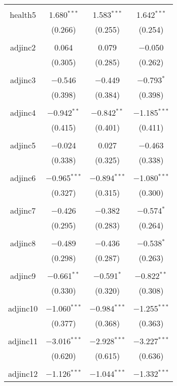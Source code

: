 \documentclass{article}
\begin{document}
\begin{longtable}{cccc}
  & & & \\ 
 health5 & 1.680$^{***}$ & 1.583$^{***}$ & 1.642$^{***}$ \\ 
  & (0.266) & (0.255) & (0.254) \\ 
  & & & \\ 
 adjinc2 & 0.064 & 0.079 & $-$0.050 \\ 
  & (0.305) & (0.285) & (0.262) \\ 
  & & & \\ 
 adjinc3 & $-$0.546 & $-$0.449 & $-$0.793$^{*}$ \\ 
  & (0.398) & (0.384) & (0.398) \\ 
  & & & \\ 
 adjinc4 & $-$0.942$^{**}$ & $-$0.842$^{**}$ & $-$1.185$^{***}$ \\ 
  & (0.415) & (0.401) & (0.411) \\ 
  & & & \\ 
 adjinc5 & $-$0.024 & 0.027 & $-$0.463 \\ 
  & (0.338) & (0.325) & (0.338) \\ 
  & & & \\ 
 adjinc6 & $-$0.965$^{***}$ & $-$0.894$^{***}$ & $-$1.080$^{***}$ \\ 
  & (0.327) & (0.315) & (0.300) \\ 
  & & & \\ 
 adjinc7 & $-$0.426 & $-$0.382 & $-$0.574$^{*}$ \\ 
  & (0.295) & (0.283) & (0.264) \\ 
  & & & \\ 
 adjinc8 & $-$0.489 & $-$0.436 & $-$0.538$^{*}$ \\ 
  & (0.298) & (0.287) & (0.263) \\ 
  & & & \\ 
 adjinc9 & $-$0.661$^{**}$ & $-$0.591$^{*}$ & $-$0.822$^{**}$ \\ 
  & (0.330) & (0.320) & (0.308) \\ 
  & & & \\ 
 adjinc10 & $-$1.060$^{***}$ & $-$0.984$^{***}$ & $-$1.255$^{***}$ \\ 
  & (0.377) & (0.368) & (0.363) \\ 
  & & & \\ 
 adjinc11 & $-$3.016$^{***}$ & $-$2.928$^{***}$ & $-$3.227$^{***}$ \\ 
  & (0.620) & (0.615) & (0.636) \\ 
  & & & \\ 
 adjinc12 & $-$1.126$^{***}$ & $-$1.044$^{***}$ & $-$1.332$^{***}$ \\ 

\end{longtable}
\end{document}
